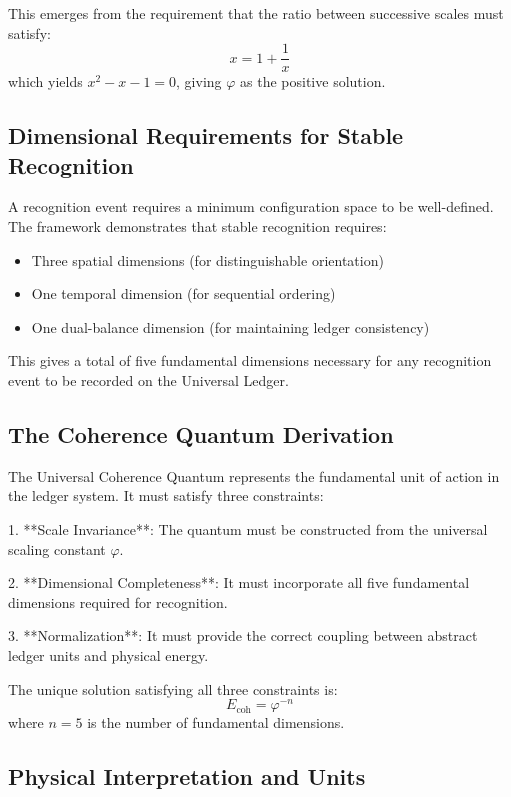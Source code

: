 \documentclass[11pt,a4paper]{article}
\theoremstyle{definition}
\theoremstyle{remark}
\begin{document}
This emerges from the requirement that the ratio between successive scales must satisfy:
\begin{equation}
    x = 1 + \frac{1}{x}
\end{equation}
which yields \(x^2 - x - 1 = 0\), giving \(\varphi\) as the positive solution.

\subsection{Dimensional Requirements for Stable Recognition}

A recognition event requires a minimum configuration space to be well-defined. The framework demonstrates that stable recognition requires:
\begin{itemize}
    \item Three spatial dimensions (for distinguishable orientation)
    \item One temporal dimension (for sequential ordering)
    \item One dual-balance dimension (for maintaining ledger consistency)
\end{itemize}

This gives a total of five fundamental dimensions necessary for any recognition event to be recorded on the Universal Ledger.

\subsection{The Coherence Quantum Derivation}

The Universal Coherence Quantum represents the fundamental unit of action in the ledger system. It must satisfy three constraints:

1. **Scale Invariance**: The quantum must be constructed from the universal scaling constant \(\varphi\).

2. **Dimensional Completeness**: It must incorporate all five fundamental dimensions required for recognition.

3. **Normalization**: It must provide the correct coupling between abstract ledger units and physical energy.

The unique solution satisfying all three constraints is:
\begin{equation}
    E_{\text{coh}} = \varphi^{-n}
\end{equation}
where \(n = 5\) is the number of fundamental dimensions.

\subsection{Physical Interpretation and Units}
\end{document}
